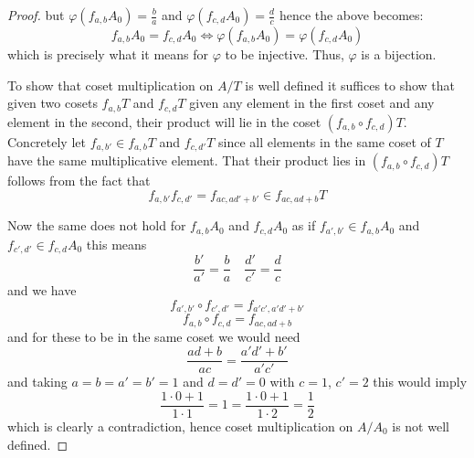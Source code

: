 \documentclass[12pt]{article}
\begin{document}
\begin{enumerate}
\begin{proof}
        but $\varphi(f_{a, b}A_0 ) = \frac{b}{a}$ and $\varphi(f_{c, d}A_0) = \frac{d}{c}$ hence
        the above becomes:
        \[  f_{a, b}A_0 = f_{c, d}A_0 \iff \varphi(f_{a, b}A_0) = \varphi(f_{c, d}A_0) \] 
        which is precisely what it means for $\varphi$ to be injective.
        Thus, $\varphi$ is a bijection.

        To show that coset multiplication on $A/T$ is well defined it suffices to show that
        given two cosets $f_{a, b}T$ and $f_{c, d}T$ given any element in the first
        coset and any element in the second, their product will lie in the coset $(f_{a, b} \circ f_{c, d})T$.
        Concretely let $f_{a, b'} \in f_{a, b}T$ and $f_{c, d'}T$ since all elements in the same coset of $T$ have the same multiplicative element.
        That
        their product lies in $(f_{a, b} \circ f_{c, d})T$ follows from the fact
        that
        \[ f_{a, b'}f_{c, d'} = f_{ac, ad' + b'} \in f_{ac, ad + b}T \]

        Now the same does not hold for $f_{a, b}A_0$ and $f_{c, d}A_0$
        as if $f_{a', b'} \in f_{a, b}A_0$ and $f_{c', d'} \in f_{c, d}A_0$
        this means
        \[ \frac{b'}{a'} = \frac{b}{a} \quad \frac{d'}{c'} = \frac{d}{c} \]
        and we have
        \[ f_{a', b'} \circ f_{c', d'} = f_{a'c', a'd' + b'} \]
        \[ f_{a, b} \circ f_{c, d} = f_{ac, ad + b} \]
        and for these to be in the same coset we would need
        \[ \frac{ad + b}{ac} = \frac{a'd' + b'}{a'c'} \]
        and taking $a = b = a' = b' = 1$ and $d = d' = 0$ with $c = 1$, $c' = 2$
        this would imply
        \[ \frac{1 \cdot 0 + 1}{1 \cdot 1} = 1 = \frac{1 \cdot 0 + 1}{1 \cdot 2} = \frac{1}{2} \]
        which is clearly a contradiction, hence coset multiplication on $A/A_0$ is not well defined.
    \end{proof}
\end{enumerate}
\end{document}
